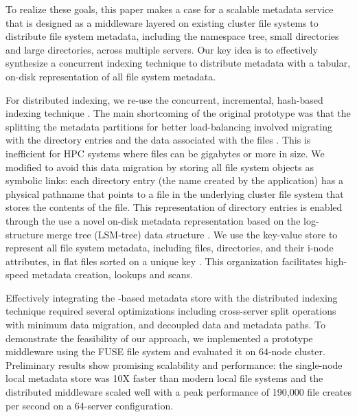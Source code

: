 To realize these goals, this paper makes a case for a scalable metadata service 
that is designed as a middleware layered on existing cluster file systems to 
distribute file system metadata, including the namespace tree, small 
directories and large directories, across multiple servers.
Our key idea is to effectively synthesize a concurrent indexing 
technique to distribute metadata with a tabular, on-disk representation of all
file system metadata. 

For distributed indexing, we re-use the concurrent, incremental, hash-based
\giga{} indexing technique \citep{giga}.
The main shortcoming of the original \giga{} prototype was that the splitting
the metadata partitions for better load-balancing involved migrating with the
directory entries and the data associated with the files \citep{giga}.
This is inefficient for HPC systems where files can be gigabytes or more in
size. We modified \giga{} to avoid this data migration by storing all file
system objects as symbolic links: each directory entry (the name created by the
application) has a physical pathname that points to a file in the underlying
cluster file system that stores the contents of the file.
This representation of directory entries is enabled through the use a novel
on-disk metadata representation based on the log-structure merge tree (LSM-tree)
data structure \citep{ONeil1996}.
We use the \ldb{} key-value store to represent all file system metadata, including 
files, directories, and their i-node attributes, in flat files sorted on a
unique key \citep{LevelDB}.
This organization facilitates high-speed metadata creation, lookups and scans.

Effectively integrating the \ldb-based metadata store with the distributed indexing
technique required several optimizations including cross-server split operations 
with minimum data migration, and decoupled data and metadata paths.
To demonstrate the feasibility of our approach, we implemented a prototype middleware
using the FUSE file system and evaluated it on 64-node cluster. Preliminary
results show promising scalability and performance: the single-node local metadata 
store was 10X faster than modern local file systems and the distributed
middleware scaled well with a peak performance of 190,000 file creates per second 
on a 64-server configuration. 


